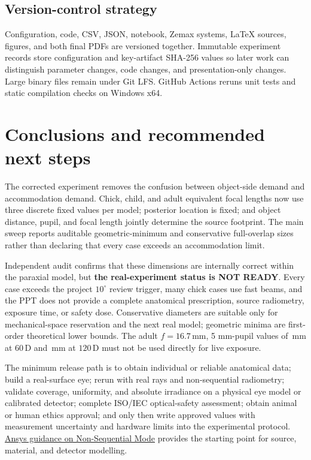 \documentclass[11pt,openany]{report}
\newcommand{\D}{\,\mathrm{D}}
\newcommand{\mm}{\,\mathrm{mm}}
\newcommand{\keyresult}[1]{\textcolor{ReportBlue}{\textbf{#1}}}
\begin{document}
\section{Version-control strategy}
Configuration, code, CSV, JSON, notebook, Zemax systems, LaTeX sources, figures, and both final PDFs are versioned together. Immutable experiment records store configuration and key-artifact SHA-256 values so later work can distinguish parameter changes, code changes, and presentation-only changes. Large binary files remain under Git LFS. GitHub Actions reruns unit tests and static compilation checks on Windows x64.

\chapter{Conclusions and recommended next steps}
The corrected experiment removes the confusion between object-side demand and accommodation demand. Chick, child, and adult equivalent focal lengths now use three discrete fixed values per model; posterior location is fixed; and object distance, pupil, and focal length jointly determine the source footprint. The main sweep reports auditable geometric-minimum and conservative full-overlap sizes rather than declaring that every case exceeds an accommodation limit.

Independent audit confirms that these dimensions are internally correct within the paraxial model, but \keyresult{the real-experiment status is NOT READY}. Every case exceeds the project $10^\circ$ review trigger, many chick cases use fast beams, and the PPT does not provide a complete anatomical prescription, source radiometry, exposure time, or safety dose. Conservative diameters are suitable only for mechanical-space reservation and the next real model; geometric minima are first-order theoretical lower bounds. The adult $f=16.7\mm$, 5 mm-pupil values of \AdultSixtyConservative\,mm at $60\D$ and \AdultOneTwentyConservative\,mm at $120\D$ must not be used directly for live exposure.

The minimum release path is to obtain individual or reliable anatomical data; build a real-surface eye; rerun with real rays and non-sequential radiometry; validate coverage, uniformity, and absolute irradiance on a physical eye model or calibrated detector; complete ISO/IEC optical-safety assessment; obtain animal or human ethics approval; and only then write approved values with measurement uncertainty and hardware limits into the experimental protocol. \href{https://optics.ansys.com/hc/en-us/articles/42661670424851-Exploring-Non-Sequential-Mode-in-OpticStudio}{Ansys guidance on Non-Sequential Mode} provides the starting point for source, material, and detector modelling.
\end{document}
